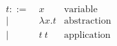 \begin{align*}
t ::=~& x               & \text{variable}\\
    |~& \lambda x . t   & \text{abstraction}\\
    |~& t~t             & \text{application}
\end{align*}
